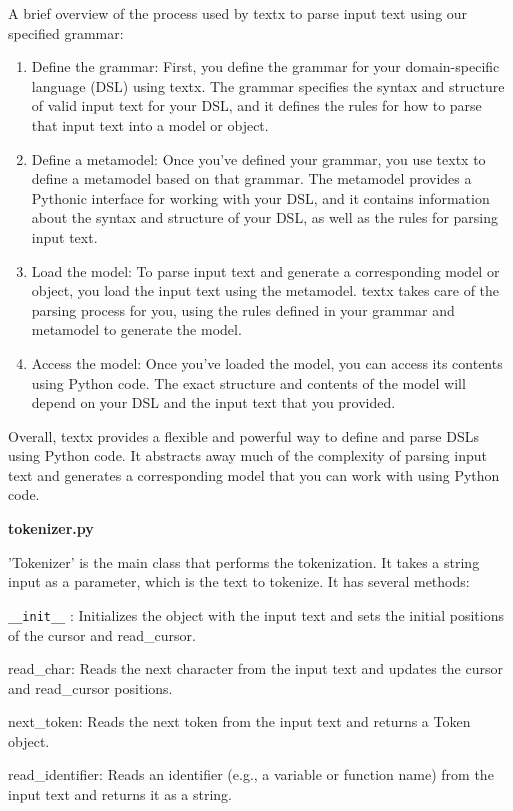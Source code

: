 A brief overview of the process used by textx to parse input text using our specified grammar:
\begin{enumerate}
    \item Define the grammar: First, you define the grammar for your domain-specific language (DSL) using textx. The grammar specifies the syntax and structure of valid input text for your DSL, and it defines the rules for how to parse that input text into a model or object.
    \item Define a metamodel: Once you've defined your grammar, you use textx to define a metamodel based on that grammar. The metamodel provides a Pythonic interface for working with your DSL, and it contains information about the syntax and structure of your DSL, as well as the rules for parsing input text.
    \item Load the model: To parse input text and generate a corresponding model or object, you load the input text using the metamodel. textx takes care of the parsing process for you, using the rules defined in your grammar and metamodel to generate the model.
    \item Access the model: Once you've loaded the model, you can access its contents using Python code. The exact structure and contents of the model will depend on your DSL and the input text that you provided.
\end{enumerate}

Overall, textx provides a flexible and powerful way to define and parse DSLs using Python code. It abstracts away much of the complexity of parsing input text and generates a corresponding model that you can work with using Python code.



\textbf{tokenizer.py}

'Tokenizer' is the main class that performs the tokenization. It takes a string input as a parameter, which is the text to tokenize. It has several methods:

\texttt{\_\_init\_\_}
: Initializes the object with the input text and sets the initial positions of the cursor and read\_cursor.

read\_char: Reads the next character from the input text and updates the cursor and read\_cursor positions.

next\_token: Reads the next token from the input text and returns a Token object.

read\_identifier: Reads an identifier (e.g., a variable or function name) from the input text and returns it as a string.


